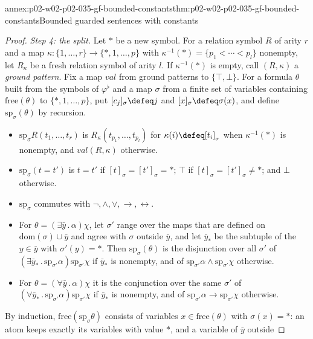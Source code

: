 \begin{annexitem}{annex:p02-w02-p02-035-gf-bounded-constants}{thm:p02-w02-p02-035-gf-bounded-constants}{Bounded guarded sentences with constants}
\begin{proof}
\emph{Step 4: the split.}  Let \(\ast\) be a new symbol.  For a relation symbol
\(R\) of arity \(r\) and a map \(\kappa:\{1,\ldots,r\}\to\{\ast,1,\ldots,p\}\)
with \(\kappa^{-1}(\ast)=\{p_1<\cdots<p_l\}\) nonempty, let \(R_\kappa\) be a
fresh relation symbol of arity \(l\).  If \(\kappa^{-1}(\ast)\) is empty, call
\((R,\kappa)\) a \emph{ground pattern}.  Fix a map \(\mathit{val}\) from
ground patterns to \(\{\top,\bot\}\).  For a formula \(\theta\) built from the
symbols of \(\varphi^{\flat}\) and a map \(\sigma\) from a finite set of
variables containing \(\mathrm{free}(\theta)\) to \(\{\ast,1,\ldots,p\}\), put
\([c_j]_\sigma\defeq j\) and \([x]_\sigma\defeq\sigma(x)\), and define
\(\mathrm{sp}_\sigma(\theta)\) by recursion.
\begin{itemize}
\item \(\mathrm{sp}_\sigma R(t_1,\ldots,t_r)\) is
  \(R_\kappa(t_{p_1},\ldots,t_{p_l})\) for \(\kappa(i)\defeq[t_i]_\sigma\) when
  \(\kappa^{-1}(\ast)\) is nonempty, and \(\mathit{val}(R,\kappa)\) otherwise.
\item \(\mathrm{sp}_\sigma(t=t')\) is \(t=t'\) if \([t]_\sigma=[t']_\sigma=\ast\);
  \(\top\) if \([t]_\sigma=[t']_\sigma\neq\ast\); and \(\bot\) otherwise.
\item \(\mathrm{sp}_\sigma\) commutes with \(\neg,\land,\lor,\to,\leftrightarrow\).
\item For \(\theta=(\exists\bar y\,.\,\alpha)\chi\), let \(\sigma'\) range over
  the maps that are defined on \(\mathrm{dom}(\sigma)\cup\bar y\) and agree
  with \(\sigma\) outside \(\bar y\), and let \(\bar y_{\ast}\) be the subtuple of
  the \(y\in\bar y\) with \(\sigma'(y)=\ast\).  Then
  \(\mathrm{sp}_\sigma(\theta)\) is the disjunction over all \(\sigma'\) of
  \((\exists\bar y_{\ast}\,.\,\mathrm{sp}_{\sigma'}\alpha)\mathrm{sp}_{\sigma'}\chi\)
  if \(\bar y_{\ast}\) is nonempty, and of
  \(\mathrm{sp}_{\sigma'}\alpha\land\mathrm{sp}_{\sigma'}\chi\) otherwise.
\item For \(\theta=(\forall\bar y\,.\,\alpha)\chi\) it is the conjunction over
  the same \(\sigma'\) of
  \((\forall\bar y_{\ast}\,.\,\mathrm{sp}_{\sigma'}\alpha)\mathrm{sp}_{\sigma'}\chi\)
  if \(\bar y_{\ast}\) is nonempty, and of
  \(\mathrm{sp}_{\sigma'}\alpha\to\mathrm{sp}_{\sigma'}\chi\) otherwise.
\end{itemize}
By induction, \(\mathrm{free}(\mathrm{sp}_\sigma\theta)\) consists of variables
\(x\in\mathrm{free}(\theta)\) with \(\sigma(x)=\ast\): an atom keeps exactly its
variables with value \(\ast\), and a variable of \(\bar y\) outside

\end{proof}
\end{annexitem}
